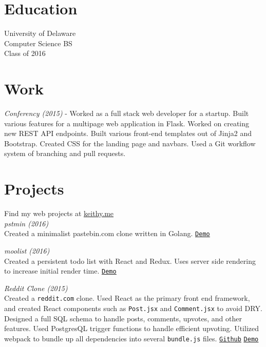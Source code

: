 \documentclass[margin]{res}
\begin{document}

\address{{\bf Address}\\346 Nicholas Ct \\Wilmington, DE 19808\\(302) 887-0387}
\address{{\bf Links}\\\url{terda12@gmail.com}\\\url{github.com/keithyong}\\\url{keithy.me}}

\begin{resume}

\section{Education}
University of Delaware\\
Computer Science BS\\
Class of 2016\\

\section{Work}
\textit{Conferency (2015)} - Worked as a full stack web developer for a startup. Built various features for a multipage web application in Flask. Worked on creating new REST API endpoints. Built various front-end templates out of Jinja2 and Bootstrap. Created CSS for the landing page and navbars. Used a Git workflow system of branching and pull requests.

\section{Projects}

Find my web projects at \underline{\url{keithy.me}}\\
\textit{pstmin (2016)}\\ Created a minimalist pastebin.com clone written in Golang. \underline{\texttt{\href{http://www.pstmin.com}{Demo}}}

\textit{moolist (2016)}\\ Created a persistent todo list with React and Redux. Uses server side rendering to increase initial render time. \underline{\texttt{\href{http://http://moolist.keithy.me}{Demo}}}

\textit{Reddit Clone (2015)}\\ Created a \texttt{reddit.com} clone. Used React as the primary front end framework, and created React components such as \texttt{Post.jsx} and \texttt{Comment.jsx} to avoid DRY. Designed a full SQL schema to handle posts, comments, upvotes, and other features. Used PostgresQL trigger functions to handle efficient upvoting. Utilized webpack to bundle up all dependencies into several \texttt{bundle.js} files. \underline{\texttt{\href{https://github.com/keithyong/pyramus}{Github}}} \underline{\texttt{\href{http://pyramus.keithy.me}{Demo}}}


\end{resume}
\end{document}
